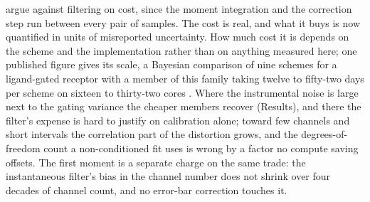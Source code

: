 \citet{delcore2025parameter} argue against filtering on cost, since the moment integration and the correction step run between every pair of samples. The cost is real, and what it buys is now quantified in units of misreported uncertainty. How much cost it is depends on the scheme and the implementation rather than on anything measured here; one published figure gives its scale, a Bayesian comparison of nine schemes for a ligand-gated receptor with a member of this family taking twelve to fifty-two days per scheme on sixteen to thirty-two cores \cite{moffatt2025bayesian}.
Where the instrumental noise is large next to the gating variance the cheaper members recover (Results), and there the filter's expense is hard to justify on calibration alone; toward few channels and short intervals the correlation part of the distortion grows, and the degrees-of-freedom count a non-conditioned fit uses is wrong by a factor no compute saving offsets. The first moment is a separate charge on the same trade: the instantaneous filter's bias in the channel number does not shrink over four decades of channel count, and no error-bar correction touches it. %

